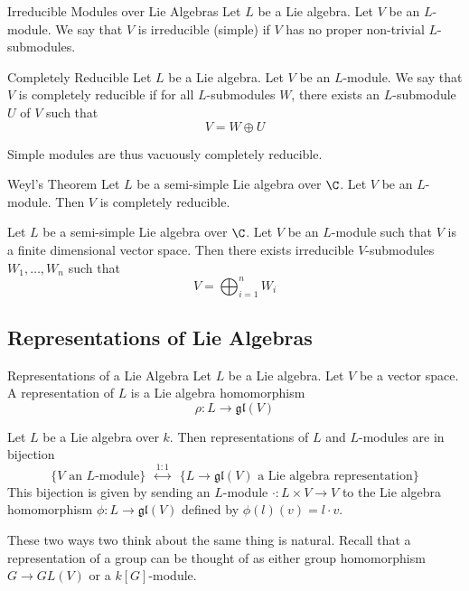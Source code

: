 \documentclass[a4paper]{article}
\begin{document}
\begin{defn}{Irreducible Modules over Lie Algebras}{} Let $L$ be a Lie algebra. Let $V$ be an $L$-module. We say that $V$ is irreducible (simple) if $V$ has no proper non-trivial $L$-submodules. 
\end{defn}

\begin{defn}{Completely Reducible}{} Let $L$ be a Lie algebra. Let $V$ be an $L$-module. We say that $V$ is completely reducible if for all $L$-submodules $W$, there exists an $L$-submodule $U$ of $V$ such that $$V=W\oplus U$$
\end{defn}

Simple modules are thus vacuously completely reducible. 

\begin{thm}{Weyl's Theorem}{} Let $L$ be a semi-simple Lie algebra over $\C$. Let $V$ be an $L$-module. Then $V$ is completely reducible. 
\end{thm}

\begin{crl}{}{} Let $L$ be a semi-simple Lie algebra over $\C$. Let $V$ be an $L$-module such that $V$ is a finite dimensional vector space. Then there exists irreducible $V$-submodules $W_1,\dots,W_n$ such that $$V=\bigoplus_{i=1}^nW_i$$
\end{crl}

\subsection{Representations of Lie Algebras}
\begin{defn}{Representations of a Lie Algebra}{} Let $L$ be a Lie algebra. Let $V$ be a vector space. A representation of $L$ is a Lie algebra homomorphism $$\rho:L\to\mathfrak{gl}(V)$$
\end{defn}

\begin{prp}{}{} Let $L$ be a Lie algebra over $k$. Then representations of $L$ and $L$-modules are in bijection $$\{V\text{ an }L\text{-module}\}\;\;\overset{1:1}{\leftrightarrow}\;\;\{L\to\mathfrak{gl}(V)\text{ a Lie algebra representation}\}$$ This bijection is given by sending an $L$-module $\cdot:L\times V\to V$ to the Lie algebra homomorphism $\phi:L\to\mathfrak{gl}(V)$ defined by $\phi(l)(v)=l\cdot v$. 
\end{prp}

These two ways two think about the same thing is natural. Recall that a representation of a group can be thought of as either group homomorphism $G\to GL(V)$ or a $k[G]$-module. \\
\end{document}
